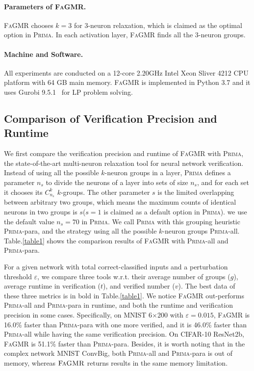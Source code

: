 \documentclass[runningheads]{llncs}
\newcommand{\ourtool}{\textsc{FaGMR}\xspace}
\newcommand{\prima}{\textsc{Prima}\xspace}
\newcommand{\mnist}{MNIST\xspace}
\begin{document}
\paragraph{Parameters of \ourtool.}
\ourtool chooses $k = 3$ for 3-neuron relaxation, which is claimed as the optimal option in \prima. 
In each activation layer, \ourtool finds all the 3-neuron groups.

\paragraph{Machine and Software.}
All experiments are conducted on a 12-core 2.20GHz Intel Xeon Sliver 4212 CPU
platform with 64 GB main memory.
\ourtool is implemented in Python 3.7 and it uses Gurobi 9.5.1~\cite{ref_url3}
for LP problem solving.

\subsection{Comparison of Verification Precision and Runtime}\label{Subsec4.2}
We first compare the verification precision and runtime of \ourtool with \prima,
the state-of-the-art multi-neuron relaxation tool for neural network verification.
Instead of using all the possible $k$-neuron groups in a layer,
\prima defines a parameter $n_{s}$ to divide the neurons of a layer into sets of
size $n_{s}$, and for each set it chooses its $C_{n_{s}}^{k}$ $k$-groups.
The other parameter $s$ is the limited overlapping between arbitrary
two groups, which means the maximum counts of identical neurons in two groups is
$s$($s = 1$ is claimed as a default option in \prima).
we use the default value $n_{s}=70$ in \prima.
We call \prima with this grouping heuristic \prima-para, and the strategy using all
the possible $k$-neuron groups \prima-all.
Table.\ref{table1} shows the comparison results of \ourtool with \prima-all and \prima-para.

For a given network with total correct-classified inputs and a perturbation threshold $\varepsilon$,
we compare three tools w.r.t. their average number of groups ($g$), average runtime in verification ($t$),
and verified number ($v$).
The best data of these three metrics is in bold in Table.\ref{table1}.
We notice \ourtool out-performs \prima-all and \prima-para in runtime, and both the
runtime and verification precision in some cases.
Specifically, on \mnist 6$\times$200 with $\varepsilon = 0.015$,
\ourtool is 16.0\% faster than \prima-para with one more verified,
and it is 46.0\% faster than \prima-all while having the same verification precision.
On CIFAR-10 ResNet2b, \ourtool is 51.1\% faster than \prima-para.
Besides, it is worth noting that in the complex network \mnist ConvBig,
both \prima-all and \prima-para is out of memory,
whereas $\ourtool$ returns results in the same memory limitation.
\end{document}
